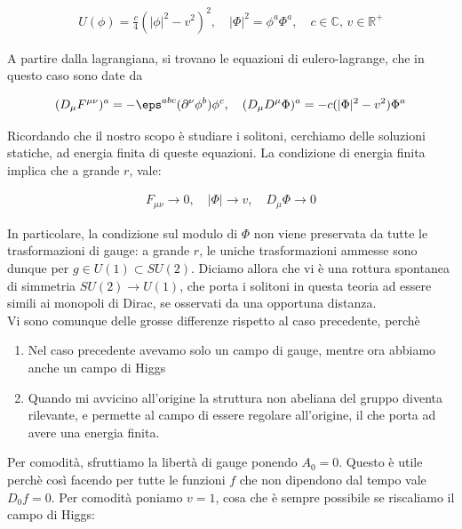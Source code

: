 \documentclass{report}
\begin{document}
\begin{align}
    U(\phi) = \frac{c}{4}(|\phi|^2 - v^2)^2, \quad |\Phi|^2 = \phi^a\Phi^a, \quad c \in \mathbb{C}, \, v \in \mathbb{R}^+
\end{align}


A partire dalla lagrangiana, si trovano le equazioni di eulero-lagrange, che in questo caso sono date da 

\begin{align}
    (D_\mu F^{\mu\nu})^a = -\eps^{abc}(\partial^\nu \phi^b)\phi^c, \quad (D_\mu D^\mu \Phi)^a = -c(|\Phi|^2 -v^2)\Phi^a
\end{align}

Ricordando che il nostro scopo è studiare i solitoni, cerchiamo delle soluzioni statiche, ad energia finita di queste equazioni. La condizione di energia finita implica che a grande \(r\), vale: 

\begin{align}
    F_{\mu\nu} \rightarrow 0, \quad |\Phi| \rightarrow v, \quad D_\mu \Phi \rightarrow 0
\end{align}

In particolare, la condizione sul modulo di \(\Phi\) non viene preservata da tutte le trasformazioni di gauge: a grande \(r\), le uniche trasformazioni ammesse sono dunque per \(g \in U(1) \subset SU(2)\). Diciamo allora che vi è una rottura spontanea di simmetria \(SU(2) \rightarrow U(1)\), che porta i solitoni in questa teoria ad essere simili ai monopoli di Dirac, se osservati da una opportuna distanza. \\

Vi sono comunque delle grosse differenze rispetto al caso precedente, perchè

\begin{enumerate}
    \item Nel caso precedente avevamo solo un campo di gauge, mentre ora abbiamo anche un campo di Higgs 
    \item Quando mi avvicino all'origine la struttura non abeliana del gruppo diventa rilevante, e permette al campo di essere regolare all'origine, il che porta ad avere una energia finita. 
\end{enumerate}

Per comodità, sfruttiamo la libertà di gauge ponendo \(A_0 = 0\). Questo è utile perchè così facendo per tutte le funzioni \(f\) che non dipendono dal tempo vale \(D_0 f = 0\). Per comodità poniamo \(v = 1\), cosa che è sempre possibile se riscaliamo il campo di Higgs: 
\end{document}
